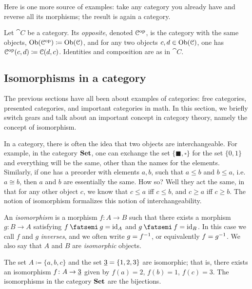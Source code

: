 \documentclass[7Sketches]{subfiles}
\begin{document}
Here is one more source of examples: take any category you already have and reverse all its morphisms; the result is again a category.
\begin{example}%
\label{def.opposite_cat}%
%
Let $\cat{C}$ be a category. Its \emph{opposite}, denoted $\mathcal{C}^{\textnormal{op}}$, is the category with the same objects, $\operatorname{Ob}(\mathcal{C}^{\textnormal{op}})\coloneqq\operatorname{Ob}(\mathcal{C})$, and for any two objects $c,d\in\operatorname{Ob}(\mathcal{C})$, one has $\mathcal{C}^{\textnormal{op}}(c,d)\coloneqq\mathcal{C}(d,c)$. Identities and composition are as in $\cat{C}$.
\end{example}

\subsection{Isomorphisms in a category}%

The previous sections have all been about examples of categories: free categories, presented categories, and important categories in math. In this section, we briefly switch gears and talk about an important concept in category theory, namely the concept of isomorphism.

In a category, there is often the idea that two objects are interchangeable. For
example, in the category $\mathbf{Set}$, one can exchange the set $\{\blacksquare,\square\}$ for the set $\{0,1\}$
and everything will be the same, other than the names for the elements. Similarly, if one has a preorder with elements $a,b$, such that $a \le b$ and $b \le a$, i.e.\ $a\cong b$, then $a$ and $b$ are essentially the same. How so? Well they act the same, in that for any other object $c$, we know that $c \le a$ iff $c
\le b$, and $c\ge a$ iff $c\geq b$. The notion of isomorphism formalizes this notion of interchangeability.

\begin{definition}%
An \emph{isomorphism} is a morphism $f\colon A \to B$ such that there exists a
morphism $g\colon B \to A$ satisfying $f\cp g=\id_A$ and $g\cp f=\id_B$. In this case
we call $f$ and $g$ \emph{inverses}, and we often write $g=f^{-1}$, or
equivalently $f=g^{-1}$. We also say that $A$ and $B$ are \emph{isomorphic}
objects.
\end{definition}%

\begin{example}%
\label{ex.simple_iso}
The set $A\coloneqq\{a,b,c\}$ and the set $\underline{{3}}=\{1,2,3\}$ are isomorphic; that is, there exists an isomorphism $f\colon A\to \underline{{3}}$ given by $f(a)=2$, $f(b)=1$, $f(c)=3$. The isomorphisms in the category $\mathbf{Set}$ are the bijections.%
\end{example}
\end{document}
